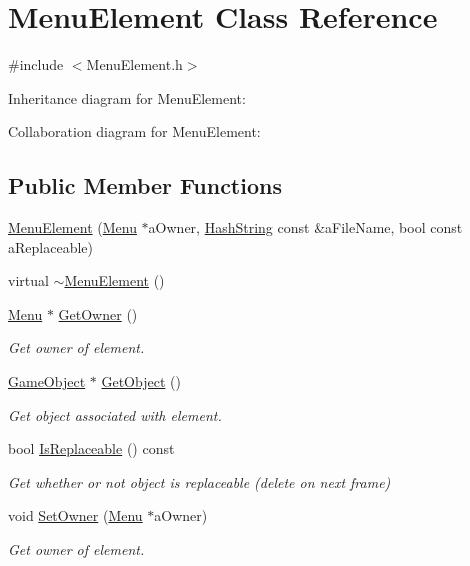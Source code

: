 \hypertarget{classMenuElement}{}\section{Menu\+Element Class Reference}
\label{classMenuElement}


{\ttfamily \#include $<$Menu\+Element.\+h$>$}



Inheritance diagram for Menu\+Element\+:


Collaboration diagram for Menu\+Element\+:
\subsection*{Public Member Functions}
\begin{DoxyCompactItemize}
\item 
\hyperlink{classMenuElement_aa408d5d51fc2bf88a66ed8a726e65f55}{Menu\+Element} (\hyperlink{classMenu}{Menu} $\ast$a\+Owner, \hyperlink{classHashString}{Hash\+String} const \&a\+File\+Name, bool const a\+Replaceable)
\item 
virtual \hyperlink{classMenuElement_a3c21f82d271e0435d3103d7847142f5c}{$\sim$\+Menu\+Element} ()
\item 
\hyperlink{classMenu}{Menu} $\ast$ \hyperlink{classMenuElement_ad0c3352889ac86890bde46863fefa613}{Get\+Owner} ()
\begin{DoxyCompactList}\small\item\em Get owner of element. \end{DoxyCompactList}\item 
\hyperlink{classGameObject}{Game\+Object} $\ast$ \hyperlink{classMenuElement_a50c4a8076298eb91c476bc83bc949aaf}{Get\+Object} ()
\begin{DoxyCompactList}\small\item\em Get object associated with element. \end{DoxyCompactList}\item 
bool \hyperlink{classMenuElement_a2dfe46adfee0edef93099d980385dce9}{Is\+Replaceable} () const 
\begin{DoxyCompactList}\small\item\em Get whether or not object is replaceable (delete on next frame) \end{DoxyCompactList}\item 
void \hyperlink{classMenuElement_a77774363bb53277062d4c45065d499f0}{Set\+Owner} (\hyperlink{classMenu}{Menu} $\ast$a\+Owner)
\begin{DoxyCompactList}\small\item\em Get owner of element. \end{DoxyCompactList}\item 

\end{DoxyCompactItemize}

